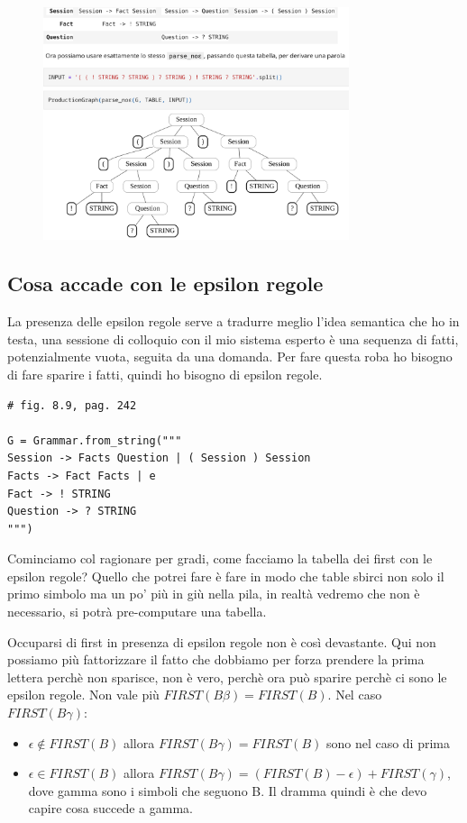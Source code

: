 \begin{figure}[ht!]
  \centering
  \includegraphics[width=0.8\textwidth]{images/Parsing/tabella_parsing_bottomup.png}
\end{figure}

\subsection{Cosa accade con le epsilon regole}
La presenza delle epsilon regole serve a tradurre meglio l'idea semantica che ho in testa, una sessione di colloquio con il mio sistema esperto è una sequenza di fatti, potenzialmente vuota, seguita da una domanda. Per fare questa roba ho bisogno di fare sparire i fatti, quindi ho bisogno di epsilon regole.

\begin{lstlisting}
# fig. 8.9, pag. 242

G = Grammar.from_string("""
Session -> Facts Question | ( Session ) Session
Facts -> Fact Facts | e
Fact -> ! STRING
Question -> ? STRING
""") 
\end{lstlisting}

Cominciamo col ragionare per gradi, come facciamo la tabella dei first con le epsilon regole? Quello che potrei fare è fare in modo che table sbirci non solo il primo simbolo ma un po' più in giù nella pila, in realtà vedremo che non è necessario, si potrà pre-computare una tabella.

Occuparsi di first in presenza di epsilon regole non è così devastante. Qui non possiamo più fattorizzare il fatto che dobbiamo per forza prendere la prima lettera perchè non sparisce, non è vero, perchè ora può sparire perchè ci sono le epsilon regole. Non vale più $FIRST(B\beta) = FIRST(B)$. Nel caso $FIRST(B\gamma)$:
\begin{itemize}
  \item $\epsilon \not\in FIRST(B)$ allora $FIRST(B\gamma) = FIRST(B)$ sono nel caso di prima
  \item $\epsilon \in FIRST(B)$ allora $FIRST(B\gamma) = (FIRST(B) - \epsilon) + FIRST(\gamma)$, dove gamma sono i simboli che seguono B. Il dramma quindi è che devo capire cosa succede a gamma.
\end{itemize}

